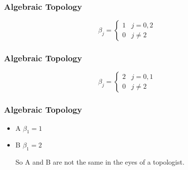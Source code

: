 \begin{frame}
\frametitle{Algebraic Topology}
\[ \beta_j = \begin{cases} 
      1 & j = 0, 2 \\
      0 & j \neq 2 
   \end{cases}
\]
\end{frame}

\begin{frame}
\frametitle{Algebraic Topology}
\[ \beta_j = \begin{cases} 
      2 & j = 0, 1 \\
      0 & j \neq 2 
   \end{cases}
\]
\end{frame}

\begin{frame}
\frametitle{Algebraic Topology}
\begin{itemize}
\item<1-> {\fontsize{70}{80}\selectfont \textsf{  A  }} $\beta_1 = 1$
\item<2-> {\fontsize{70}{80}\selectfont \textsf{  B  }} $\beta_1 = 2$

So A and B are not the same in the eyes of a topologist.
\end{itemize}

\end{frame}